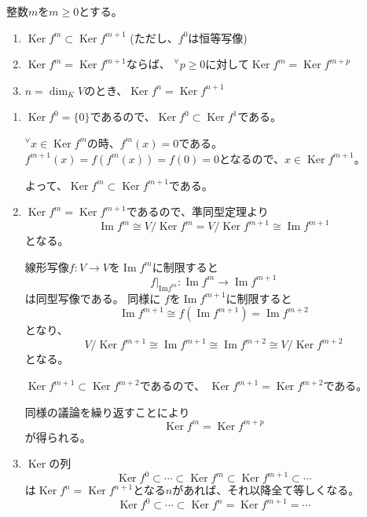 \documentclass[12pt,b5paper]{ltjsarticle}
\newcommand{\Img}{\mathop{\mathrm{Im}}\nolimits}
\newcommand{\Ker}{\mathop{\mathrm{Ker}}\nolimits}
\begin{document}
整数$m$を$m\geq 0$とする。
\begin{enumerate}
 \item $\Ker f^m \subset \Ker f^{m+1}$ (ただし、$f^0$は恒等写像)
 \item $\Ker f^m = \Ker f^{m+1}$ならば、
       ${}^{\forall}p\geq 0$に対して$\Ker f^m = \Ker f^{m+p}$
 \item $n=\dim_K V$のとき、$\Ker f^n = \Ker f^{n+1}$
\end{enumerate}

\dotfill

\begin{enumerate}
 \item
      $\Ker f^0=\{0\}$であるので、$\Ker f^0 \subset \Ker f^1$である。

      ${}^{\forall}x\in\Ker f^m$の時、$f^m(x)=0$である。
      $f^{m+1}(x)=f(f^m(x))=f(0)=0$となるので、$x\in\Ker f^{m+1}$。

      よって、$\Ker f^m \subset \Ker f^{m+1}$である。

 \item
      $\Ker f^m = \Ker f^{m+1}$であるので、準同型定理より
      \begin{equation}
       \Img f^m \cong V/\Ker f^m = V/\Ker f^{m+1} \cong \Img f^{m+1}
      \end{equation}
      となる。

      線形写像$f:V\to V$を$\Img f^{m}$に制限すると
      \begin{equation}
       f |_{\mathrm{Im} f^m} : \Img f^m \to \Img f^{m+1}
      \end{equation}
      は同型写像である。
      同様に
      $f$を$\Img f^{m+1}$に制限すると
      \begin{equation}
       \Img f^{m+1} \cong f(\Img f^{m+1})=\Img f^{m+2}
      \end{equation}
      となり、
      \begin{equation}
       V/\Ker f^{m+1} \cong
       \Img f^{m+1} \cong \Img f^{m+2}
       \cong V/\Ker f^{m+2}
      \end{equation}
      となる。

      $\Ker f^{m+1} \subset \Ker f^{m+2}$であるので、
      $\Ker f^{m+1} = \Ker f^{m+2}$である。

      同様の議論を繰り返すことにより
      \begin{equation}
       \Ker f^m = \Ker f^{m+p}
      \end{equation}
      が得られる。


 \item
      $\Ker$の列
      \begin{equation}
       \Ker f^0 \subset \cdots \subset \Ker f^m \subset \Ker f^{m+1} \subset \cdots
      \end{equation}
      は$\Ker f^n=\Ker f^{n+1}$となる$n$があれば、それ以降全て等しくなる。
      \begin{equation}
       \Ker f^0 \subset \cdots \subset \Ker f^n = \Ker f^{m+1} = \cdots
      \end{equation}


\end{enumerate}
\end{document}
